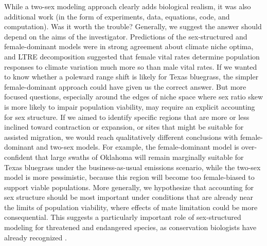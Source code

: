 \documentclass[9pt,twocolumn,twoside,lineno]{pnas-new}
\begin{document}
While a two-sex modeling approach clearly adds biological realism, it was also additional work (in the form of experiments, data, equations, code, and computation). 
Was it worth the trouble? 
Generally, we suggest the answer should depend on the aims of the investigator. 
Predictions of the sex-structured and female-dominant models were in strong agreement about climate niche optima, and LTRE decomposition suggested that female vital rates determine population responses to climate variation much more so than male vital rates. 
If we wanted to know whether a poleward range shift is likely for Texas bluegrass, the simpler female-dominant approach could have given us the correct answer. 
But more focused questions, especially around the edges of niche space where sex ratio skew is more likely to impair population viability, may require an explicit accounting for sex structure. 
If we aimed to identify specific regions that are more or less inclined toward contraction or expansion, or sites that might be suitable for assisted migration, we would reach qualitatively different conclusions with female-dominant and two-sex models. 
For example, the female-dominant model is over-confident that large swaths of Oklahoma will remain marginally suitable for Texas bluegrass under the business-as-usual emissions scenario, while the two-sex model is more pessimistic, because this region will become too female-biased to support viable populations. 
More generally, we hypothesize that accounting for sex structure should be most important under conditions that are already near the limits of population viability, where effects of mate limitation could be more consequential. 
This suggests a particularly important role of sex-structured modeling for threatened and endangered species, as conservation biologists have already recognized \citep{milner1994population,jenouvrier2012effects}. 
\end{document}
